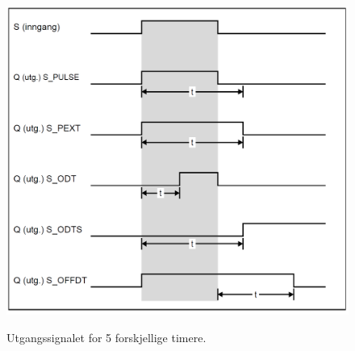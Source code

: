 \begin{figure}[ht]
    \centering
    \includegraphics[scale=0.775]{Main/figures/test.PNG}
    \label{fig:timere}
    \caption{Utgangssignalet for 5 forskjellige timere.}
\end{figure}


